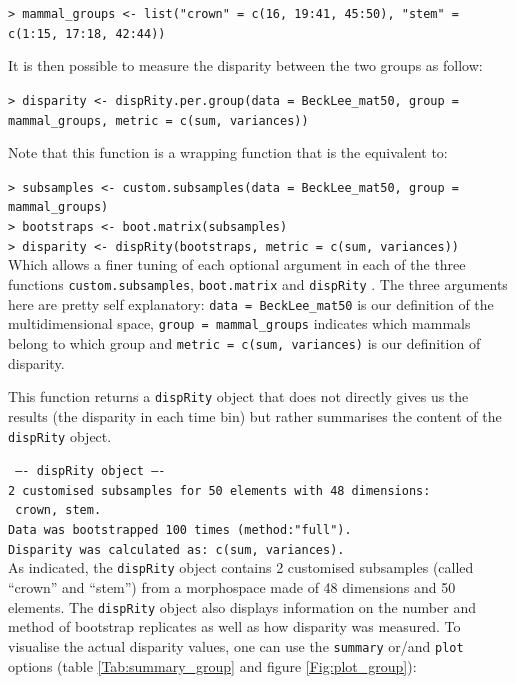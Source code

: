 \documentclass[12pt,letterpaper]{article}
\newcommand{\disp}{\texttt{dispRity} }
\begin{document}
\texttt{> mammal\_groups <- list("crown" = c(16, 19:41, 45:50), "stem" = c(1:15, 17:18, 42:44))}

\noindent It is then possible to measure the disparity between the two groups as follow:

\texttt{> disparity <- dispRity.per.group(data = BeckLee\_mat50, group = mammal\_groups, metric = c(sum, variances))}

\noindent Note that this function is a wrapping function that is the equivalent to:

\texttt{> subsamples <- custom.subsamples(data = BeckLee\_mat50, group = mammal\_groups)}\\
\texttt{> bootstraps <- boot.matrix(subsamples)}\\
\texttt{> disparity <- dispRity(bootstraps, metric = c(sum, variances))}\\


\noindent Which allows a finer tuning of each optional argument in each of the three functions \texttt{custom.subsamples}, \texttt{boot.matrix} and \disp.
The three arguments here are pretty self explanatory: \texttt{data = BeckLee\_mat50} is our definition of the multidimensional space, \texttt{group = mammal\_groups} indicates which mammals belong to which group and \texttt{metric = c(sum, variances)} is our definition of disparity. 

This function returns a \disp object that does not directly gives us the results (the disparity in each time bin) but rather summarises the content of the \disp object.

\noindent \texttt{ ---- dispRity object ---- }\\
\noindent \texttt{2 customised subsamples for 50 elements with 48 dimensions:}\\
\noindent \texttt{    crown, stem.}\\
\noindent \texttt{Data was bootstrapped 100 times (method:"full").}\\
\noindent \texttt{Disparity was calculated as: c(sum, variances).}\\

\bigskip
As indicated, the \disp object contains 2 customised subsamples (called ``crown'' and ``stem'') from a morphospace made of 48 dimensions and 50 elements.
The \disp object also displays information on the number and method of bootstrap replicates as well as how disparity was measured.
To visualise the actual disparity values, one can use the \texttt{summary} or/and \texttt{plot} options (table \ref{Tab:summary_group} and figure \ref{Fig:plot_group}):
\end{document}
